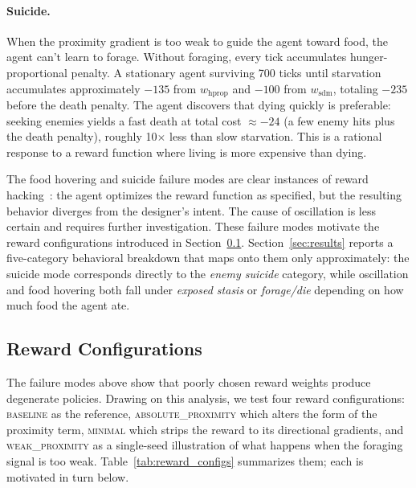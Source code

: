 \documentclass[12pt,a4paper,titlepage]{article}
\begin{document}
\paragraph{Suicide.} When the proximity gradient is too weak to guide the agent toward food, the agent can't learn to forage. Without foraging, every tick accumulates hunger-proportional penalty. A stationary agent surviving 700 ticks until starvation accumulates approximately $-135$ from $w_\text{hprop}$ and $-100$ from $w_\text{sdm}$, totaling $-235$ before the death penalty. The agent discovers that dying quickly is preferable: seeking enemies yields a fast death at total cost $\approx -24$ (a few enemy hits plus the death penalty), roughly 10$\times$ less than slow starvation. This is a rational response to a reward function where living is more expensive than dying.

The food hovering and suicide failure modes are clear instances of reward hacking~\citep{Amodei2016, Leike2017}: the agent optimizes the reward function as specified, but the resulting behavior diverges from the designer's intent. The cause of oscillation is less certain and requires further investigation. These failure modes motivate the reward configurations introduced in Section~\ref{sec:reward_configs}. Section~\ref{sec:results} reports a five-category behavioral breakdown that maps onto them only approximately: the suicide mode corresponds directly to the \textit{enemy suicide} category, while oscillation and food hovering both fall under \textit{exposed stasis} or \textit{forage/die} depending on how much food the agent ate.

\subsection{Reward Configurations}
\label{sec:reward_configs}

The failure modes above show that poorly chosen reward weights produce degenerate policies. Drawing on this analysis, we test four reward configurations: \textsc{baseline} as the reference, \textsc{absolute\_proximity} which alters the form of the proximity term, \textsc{minimal} which strips the reward to its directional gradients, and \textsc{weak\_proximity} as a single-seed illustration of what happens when the foraging signal is too weak. Table~\ref{tab:reward_configs} summarizes them; each is motivated in turn below.
\end{document}

